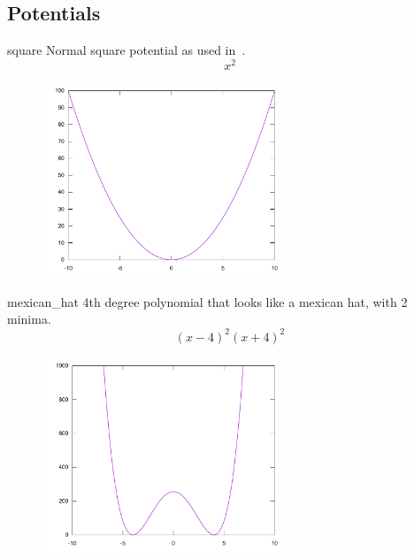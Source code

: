 \documentclass[11pt,DIV=10,final]{scrreprt} %
\begin{document}
\begin{appendix}
{\section{Potentials}\label{sec:potentials}
\begin{description}
\begin{minipage}{\textwidth}
  \item[square] Normal square potential as used in~\cite{hall2013quantum}.
        \[
        x^{2}
        \]
        \begin{figure}[H]
          \centering
          \includegraphics[width=0.65\textwidth]{plots/square.pdf}
        \end{figure}
\end{minipage}
\begin{minipage}{\textwidth}
  \item[mexican\_hat] 4th degree polynomial that looks like a mexican hat, with 2 minima.
        \[
        (x-4)^{2}(x + 4)^{2}
        \]
        \begin{figure}[H]
          \centering
          \includegraphics[width=0.65\textwidth]{plots/mexican_hat.pdf}
        \end{figure}
\end{minipage}

\end{description}}
\end{appendix}
\end{document}
